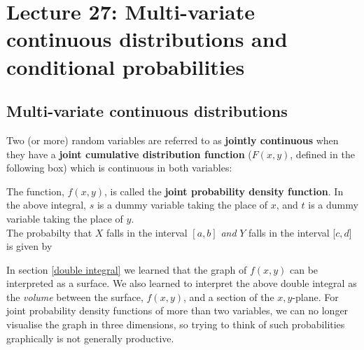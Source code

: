 \chapter{Lecture 27: Multi-variate continuous distributions and conditional probabilities}

\section{Multi-variate continuous distributions} \label{jointly continuous} \label{joint cumulative distribution function} \label{joint probability density function}  \label{f(x,y) symbol}
\label{F(x,y) symbol}
Two (or more) random variables are referred to as \textbf{jointly continuous} when they have a \textbf{joint cumulative distribution function} ($F(x,y)$, defined in the following box) which is continuous in both variables:

  	\bigskip
	
	\hfil{}
	\bigskip
	\bigskip

\noindent The function, $f(x,y)$, is called the \textbf{joint probability density function}. In the above integral, $s$ is a dummy variable taking the place of $x$, and $t$ is a dummy variable taking the place of $y$. \\

\noindent The probabilty that $X$ falls in the interval $[a,b]$ \textit{and} $Y$ falls in the interval [$c,d$] is given by

  	\bigskip
	
	\hfil{}
	\bigskip
	\bigskip

\noindent In section \ref{double integral} we learned that the graph of $f(x,y)$ can be interpreted as a surface. We also learned to interpret the above double integral as the \textit{volume} between the surface, $f(x,y)$, and a section of the $x,y$-plane. For joint probability density functions of more than two variables, we can no longer visualise the graph in three dimensions, so trying to think of such probabilities graphically is not generally productive. \\

